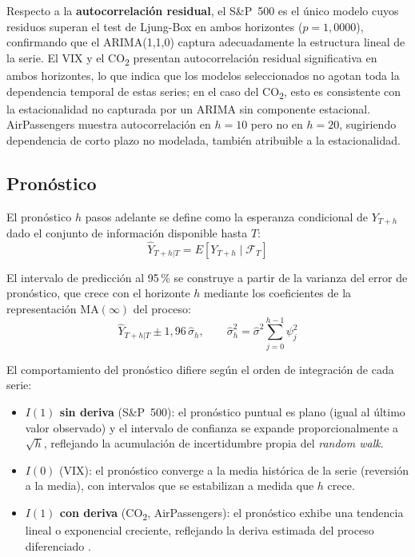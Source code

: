 \documentclass[12pt, a4paper]{article}
\begin{document}
Respecto a la \textbf{autocorrelación residual}, el S\&P~500 es el único modelo cuyos residuos superan el test de Ljung-Box en ambos horizontes ($p = 1{,}0000$), confirmando que el ARIMA(1,1,0) captura adecuadamente la estructura lineal de la serie. El VIX y el CO\textsubscript{2} presentan autocorrelación residual significativa en ambos horizontes, lo que indica que los modelos seleccionados no agotan toda la dependencia temporal de estas series; en el caso del CO\textsubscript{2}, esto es consistente con la estacionalidad no capturada por un ARIMA sin componente estacional. AirPassengers muestra autocorrelación en $h=10$ pero no en $h=20$, sugiriendo dependencia de corto plazo no modelada, también atribuible a la estacionalidad.

\subsection{Pronóstico}

El pronóstico $h$ pasos adelante se define como la esperanza condicional de $Y_{T+h}$ dado el conjunto de información disponible hasta $T$:
$$\hat{Y}_{T+h|T} = E[Y_{T+h} \mid \mathcal{F}_T]$$

El intervalo de predicción al 95\,\% se construye a partir de la varianza del error de pronóstico, que crece con el horizonte $h$ mediante los coeficientes de la representación MA$(\infty)$ del proceso:
$$\hat{Y}_{T+h|T} \pm 1{,}96\,\hat{\sigma}_h, \qquad \hat{\sigma}_h^2 = \hat{\sigma}^2\sum_{j=0}^{h-1}\psi_j^2$$

El comportamiento del pronóstico difiere según el orden de integración de cada serie:

\begin{itemize}
    \item \textbf{$I(1)$ sin deriva} (S\&P~500): el pronóstico puntual es plano (igual al último valor observado) y el intervalo de confianza se expande proporcionalmente a $\sqrt{h}$, reflejando la acumulación de incertidumbre propia del \textit{random walk}.
    \item \textbf{$I(0)$} (VIX): el pronóstico converge a la media histórica de la serie (reversión a la media), con intervalos que se estabilizan a medida que $h$ crece.
    \item \textbf{$I(1)$ con deriva} (CO\textsubscript{2}, AirPassengers): el pronóstico exhibe una tendencia lineal o exponencial creciente, reflejando la deriva estimada del proceso diferenciado \cite{hyndman2018}.
\end{itemize}
\end{document}
